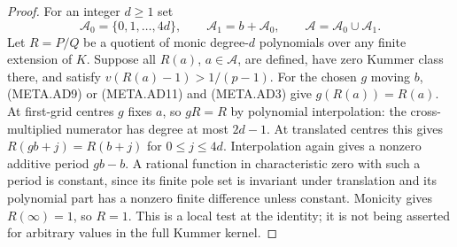 \begin{proof}
For an integer $d\ge1$ set
\[
 \mathcal A_0=\{0,1,\ldots,4d\},\qquad
 \mathcal A_1=b+\mathcal A_0,\qquad
 \mathcal A=\mathcal A_0\cup\mathcal A_1.                       \tag{META.AD12}
\]
Let $R=P/Q$ be a quotient of monic degree-$d$ polynomials
over any finite extension of $K$.
Suppose all $R(a)$, $a\in\mathcal A$, are defined,
have zero Kummer class there, and satisfy
$v(R(a)-1)>1/(p-1)$.
For the chosen $g$ moving $b$, (META.AD9) or (META.AD11)
and (META.AD3) give $g(R(a))=R(a)$.
At first-grid centres $g$ fixes $a$, so $gR=R$ by
polynomial interpolation: the cross-multiplied numerator
has degree at most $2d-1$.
At translated centres this gives
$R(gb+j)=R(b+j)$ for $0\le j\le4d$.
Interpolation again gives a nonzero additive period
$gb-b$.  A rational function in characteristic zero
with such a period is constant, since its finite pole
set is invariant under translation and its polynomial
part has a nonzero finite difference unless constant.
Monicity gives $R(\infty)=1$, so $R=1$.
This is a local test at the identity; it is not being
asserted for arbitrary values in the full Kummer kernel.

\end{proof}
